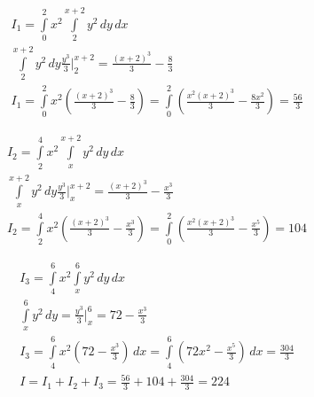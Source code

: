 \documentclass[a4paper,fleqn,12pt]{article}
\theoremstyle{definition}
\begin{document}
\begin{gather*}
I_1 = \int\limits_0 ^2 x^2 \int\limits_{2} ^{x+2} y^2\, dy \, dx\\
\int\limits_{2} ^{x+2} y^2\, dy  \frac{y^3}{3} \Big|_{2} ^{x+2} = \frac{(x+2)^3}{3} - \frac{8}{3}\\
I_1 = \int\limits_0 ^2 x^2 \left(\frac{(x+2)^3}{3} - \frac{8}{3} \right) =  \int\limits_0 ^2 \left(\frac{x^2(x+2)^3}{3} - \frac{8x^2}{3} \right) = \frac{56}{3} 
\end{gather*}

\begin{gather*}
I_2 = \int\limits_2 ^4 x^2 \int\limits_{x} ^{x+2} y^2 \, dy\, dx \\
\int\limits_{x} ^{x+2} y^2\, dy  \frac{y^3}{3} \Big|_{x} ^{x+2} = \frac{(x+2)^3}{3} - \frac{x^3}{3}\\
I_2 = \int\limits_2 ^4 x^2 \left(\frac{(x+2)^3}{3} - \frac{x^3}{3} \right) =  \int\limits_0 ^2 \left(\frac{x^2(x+2)^3}{3} - \frac{x^5}{3} \right) = 104 
\end{gather*}

\begin{gather*}
I_3 = \int\limits_4 ^6 x^2 \int\limits_{x} ^{6} y^2\, dy \, dx \\
\int\limits_{x} ^{6} y^2\, dy = \frac{y^3}{3} \Big|_{x} ^{6} = 72 - \frac{x^3}{3} \\
I_3 = \int\limits_4 ^6 x^2 \left( 72 - \frac{x^3}{3}\right) \, dx =  \int\limits_4 ^6 \left( 72x^2 - \frac{x^5}{3}\right) \, dx = \frac{304}{3} \\
I = I_1 + I_2 + I_3 = \frac{56}{3} + 104 + \frac{304}{3} = 224
\end{gather*}
\end{document}
